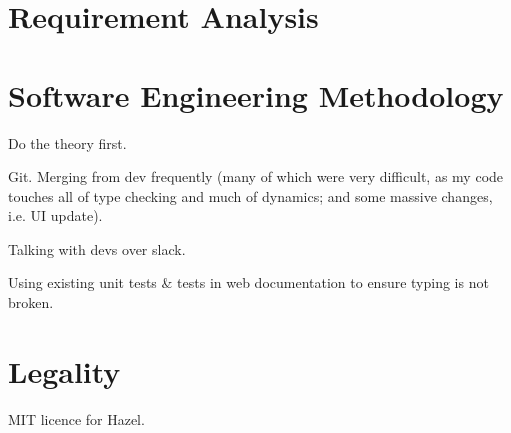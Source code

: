 \section{Requirement Analysis}\label{sec:RequirementAnalysis}

\section{Software Engineering Methodology}\label{sec:EngineeringMethodology}
Do the theory first. 

Git. Merging from dev frequently (many of which were very difficult, as my code touches all of type checking and much of dynamics; and some massive changes, i.e. UI update). 

Talking with devs over slack.

Using existing unit tests \& tests in web documentation to ensure typing is not broken.

\section{Legality}\label{sec:Legality}
MIT licence for Hazel.